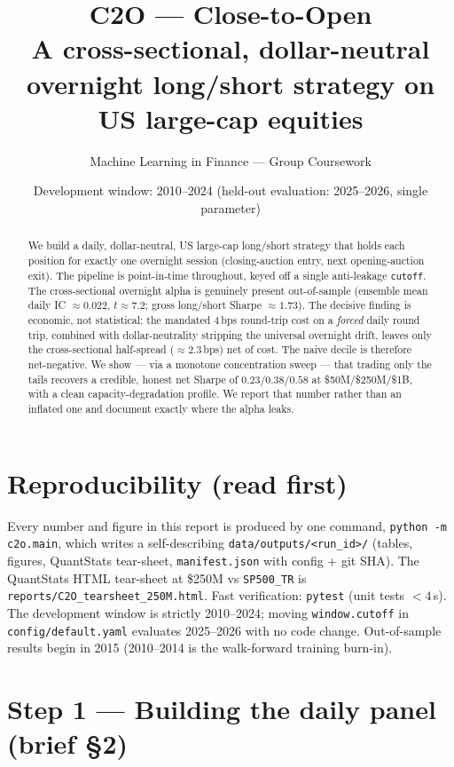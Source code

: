 \documentclass[11pt,a4paper]{article}
\title{\textbf{C2O --- Close-to-Open}\\[2pt]
\large A cross-sectional, dollar-neutral overnight long/short strategy on US large-cap equities}
\author{Machine Learning in Finance --- Group Coursework}
\date{Development window: 2010--2024 \quad(held-out evaluation: 2025--2026, single \code{cutoff} parameter)}
\newcommand{\code}[1]{\texttt{#1}}
\newcommand{\icEns}{0.022}
\newcommand{\icEnsT}{7.2}
\newcommand{\grossSharpeBench}{1.73}
\newcommand{\netSmall}{0.23}
\newcommand{\netBench}{0.38}
\newcommand{\netLarge}{0.58}
\begin{document}
\maketitle

\begin{abstract}
\noindent We build a daily, dollar-neutral, US large-cap long/short strategy that holds each position for
exactly one overnight session (closing-auction entry, next opening-auction exit). The pipeline is
point-in-time throughout, keyed off a single anti-leakage \code{cutoff}. The cross-sectional overnight
alpha is genuinely present out-of-sample (ensemble mean daily IC $\approx\icEns$, $t\approx\icEnsT$; gross
long/short Sharpe $\approx\grossSharpeBench$). The decisive finding is economic, not statistical: the
mandated $4$\,bps round-trip cost on a \emph{forced} daily round trip, combined with dollar-neutrality
stripping the universal overnight drift, leaves only the cross-sectional half-spread ($\approx2.3$\,bps) net
of cost. The naive decile is therefore net-negative. We show --- via a monotone concentration sweep --- that
trading only the tails recovers a credible, honest net Sharpe of $\netSmall/\netBench/\netLarge$ at
\$50M/\$250M/\$1B, with a clean capacity-degradation profile. We report that number rather than an inflated
one and document exactly where the alpha leaks.
\end{abstract}

\section*{Reproducibility (read first)}
Every number and figure in this report is produced by one command, \code{python -m c2o.main}, which writes a
self-describing \code{data/outputs/<run\_id>/} (tables, figures, QuantStats tear-sheet, \code{manifest.json}
with config + git SHA). The QuantStats HTML tear-sheet at \$250M vs \code{SP500\_TR} is
\code{reports/C2O\_tearsheet\_250M.html}. Fast verification: \code{pytest} (unit tests $<4$\,s). The development
window is strictly 2010--2024; moving \code{window.cutoff} in \code{config/default.yaml} evaluates 2025--2026
with no code change. Out-of-sample results begin in 2015 (2010--2014 is the walk-forward training burn-in).

\section{Step 1 --- Building the daily panel (brief §2)}
\end{document}
